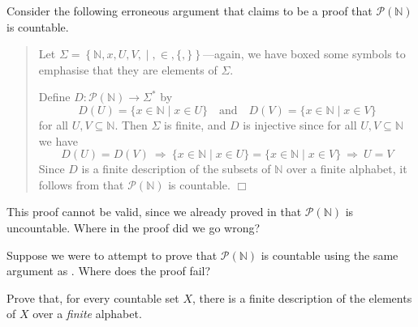 \begin{exercise}
Consider the following erroneous argument that claims to be a proof that $\mathcal{P}(\mathbb{N})$ is countable.
\begin{quote}
Let $\Sigma = \left\{ \mathbb{N},x,U,V,\boxed{\mid},\boxed{\in},\boxed{\{},\boxed{\}} \right\}$---again, we have boxed some symbols to emphasise that they are elements of $\Sigma$.

Define $D : \mathcal{P}(\mathbb{N}) \to \Sigma^*$ by
\[ D(U) = \{ x \in \mathbb{N} \mid x \in U \} \quad \text{and} \quad D(V) = \{ x \in \mathbb{N} \mid x \in V \} \]
for all $U, V \subseteq \mathbb{N}$. Then $\Sigma$ is finite, and $D$ is injective since for all $U,V \subseteq \mathbb{N}$ we have
\[ D(U) = D(V) ~ \Rightarrow ~ \{ x \in \mathbb{N} \mid x \in U \} = \{ x \in \mathbb{N} \mid x \in V \} ~ \Rightarrow ~ U = V \]
Since $D$ is a finite description of the subsets of $\mathbb{N}$ over a finite alphabet, it follows from  that $\mathcal{P}(\mathbb{N})$ is countable. \hfill $\Box$
\end{quote}
This proof cannot be valid, since we already proved in  that $\mathcal{P}(\mathbb{N})$ is uncountable. Where in the proof did we go wrong?
\end{exercise}

\begin{exercise}
Suppose we were to attempt to prove that $\mathcal{P}(\mathbb{N})$ is countable using the same argument as . Where does the proof fail?
\end{exercise}

\begin{exercise}
Prove that, for every countable set $X$, there is a finite description of the elements of $X$ over a \textit{finite} alphabet.
\end{exercise}